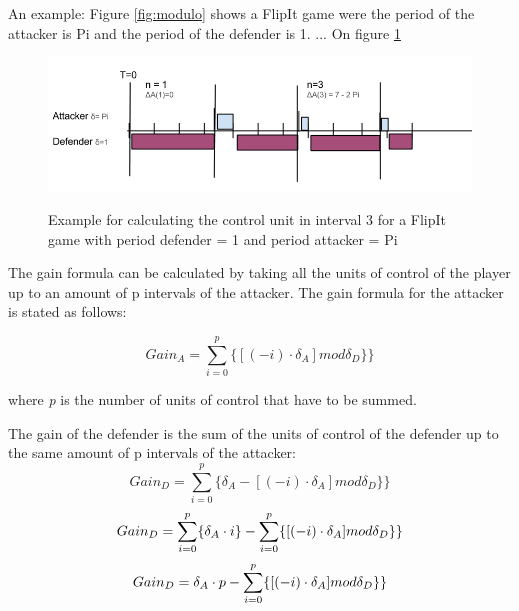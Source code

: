 An example: Figure \ref{fig:modulo} shows a FlipIt game were the period of the attacker is Pi and the period of the defender is 1. ...
On figure \ref{fig:unitofcontrolformula} 

\begin{figure}[hbtp]
\caption{Example for calculating the control unit in interval 3 for a FlipIt game with period defender = 1 and period attacker = Pi}
\centering
\includegraphics[scale=0.6]{Images/VoorbeeldUnit.png}
\label{fig:unitofcontrolformula}
\end{figure}

The gain formula can be calculated by taking all the units of control of the player up to an amount of p intervals of the attacker. The gain formula for the attacker is stated as follows:

\begin{equation}\label{first}
Gain_{A} = \sum_{i=0}^{p} \lbrace [( - i ) \cdot \delta_{A}] mod \delta_{D}  \rbrace \rbrace 
\end{equation}

where \textit{p} is the number of units of control that have to be summed.  



The gain of the defender is the sum of the units of control of the defender up to the same amount of p intervals of the attacker:
\begin{equation}\label{first}
Gain_{D} = \sum_{i=0}^{p} \lbrace \delta_{A} - [( - i ) \cdot \delta_{A}] mod \delta_{D} \rbrace  \rbrace  
\end{equation}
\begin{equation}\label{first}
Gain_{D} = \sum_{i=0}^{p} \lbrace \delta_{A} \cdot i \rbrace - \sum_{i=0}^{p} \lbrace [( - i ) \cdot \delta_{A}] mod \delta_{D} \rbrace \rbrace  \\
\end{equation}
\begin{equation}\label{first}
Gain_{D} =\delta_{A} \cdot p - \sum_{i=0}^{p} \lbrace [( - i ) \cdot \delta_{A}] mod \delta_{D} \rbrace  \rbrace  \\
\end{equation}

